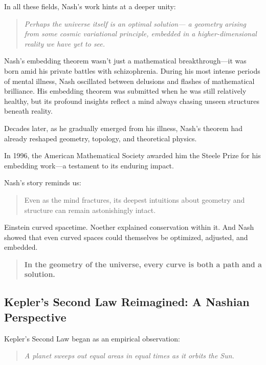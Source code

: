 In all these fields, Nash’s work hints at a deeper unity:

\begin{quote}
\textit{Perhaps the universe itself is an optimal solution—  
a geometry arising from some cosmic variational principle,  
embedded in a higher-dimensional reality we have yet to see.}
\end{quote}

\begin{tcolorbox}[colback=gray!5!white, colframe=gray!50!black, breakable, title={Historical Sidebar: Nash’s Struggle—and Triumph}]
  
  Nash’s embedding theorem wasn’t just a mathematical breakthrough—it was born amid his private battles with schizophrenia.  
  During his most intense periods of mental illness, Nash oscillated between delusions and flashes of mathematical brilliance.  
  His embedding theorem was submitted when he was still relatively healthy, but its profound insights reflect a mind always chasing unseen structures beneath reality.

  Decades later, as he gradually emerged from his illness, Nash’s theorem had already reshaped geometry, topology, and theoretical physics.

  In 1996, the American Mathematical Society awarded him the Steele Prize for his embedding work—a testament to its enduring impact.

  Nash’s story reminds us:  
  \begin{quote}
  Even as the mind fractures, its deepest intuitions about geometry and structure can remain astonishingly intact.
  \end{quote}

\end{tcolorbox}

Einstein curved spacetime.  
Noether explained conservation within it.  
And Nash showed that even curved spaces could themselves be optimized, adjusted, and embedded.

\begin{quote}
\textbf{In the geometry of the universe, every curve is both a path and a solution.}
\end{quote}


\subsection{Kepler’s Second Law Reimagined: A Nashian Perspective}

Kepler’s Second Law began as an empirical observation:  
\begin{quote}
\textit{A planet sweeps out equal areas in equal times as it orbits the Sun.}
\end{quote}


